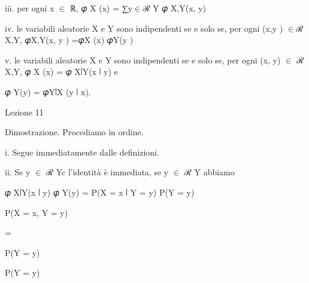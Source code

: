 \documentclass[a4paper,portrait,12pt]{article}
\begin{document}
\begin{flushleft}
iii. per ogni x $\in$ ℝ, 𝜑 X (x) = ∑y$\in$ℛ Y 𝜑 X,Y(x, y)
\end{flushleft}





\begin{flushleft}
iv. le variabili aleatorie X e Y sono indipendenti se e solo se, per ogni (x,y ) $\in$ℛ X,Y, 𝜑X,Y(x, y ) =𝜑X (x) 𝜑Y(y )
\end{flushleft}


\begin{flushleft}
v. le variabili aleatorie X e Y sono indipendenti se e solo se, per ogni (x, y) $\in$ ℛ X,Y, 𝜑 X (x) = 𝜑 X∣Y(x ∣ y) e
\end{flushleft}


\begin{flushleft}
𝜑 Y(y) = 𝜑Y∣X (y ∣ x).
\end{flushleft}





\begin{flushleft}
Lezione 11
\end{flushleft}





\begin{flushleft}
Dimostrazione. Procediamo in ordine.
\end{flushleft}


\begin{flushleft}
i. Segue immediatamente dalle definizioni.
\end{flushleft}


\begin{flushleft}
ii. Se y $\in$ ℛ Yc l'identit\`{a} \`{e} immediata, se y $\in$ ℛ Y abbiamo
\end{flushleft}


\begin{flushleft}
𝜑 X∣Y(x ∣ y) 𝜑 Y(y) = P(X = x ∣ Y = y) P(Y = y)
\end{flushleft}


\begin{flushleft}
P(X = x, Y = y)
\end{flushleft}


=


\begin{flushleft}
P(Y = y)
\end{flushleft}


\begin{flushleft}
P(Y = y)
\end{flushleft}
\end{document}
